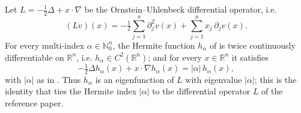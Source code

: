 \begin{lemma}
Let $L = -\tfrac12\Delta + x\cdot\nabla$ be the Ornstein--Uhlenbeck differential
operator, i.e.
\[
  (Lv)(x) = -\tfrac12 \sum_{j=1}^n \partial_j^2 v(x)
              + \sum_{j=1}^n x_j\, \partial_j v(x).
\]
For every multi-index $\alpha \in \mathbb{N}_0^n$, the Hermite function
$h_\alpha$ of  is twice continuously differentiable on
$\mathbb{R}^n$, i.e. $h_\alpha \in C^2(\mathbb{R}^n)$; and for every
$x \in \mathbb{R}^n$ it satisfies
\[
  -\tfrac12 \Delta h_\alpha(x) + x\cdot\nabla h_\alpha(x) = |\alpha|\, h_\alpha(x),
\]
with $|\alpha|$ as in .  Thus $h_\alpha$ is an eigenfunction
of $L$ with eigenvalue $|\alpha|$; this is the identity that ties the Hermite index
$|\alpha|$ to the differential operator $L$ of the reference paper.
\end{lemma}

